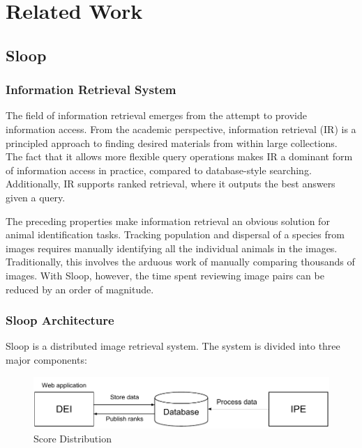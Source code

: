 \graphicspath{{./images/chap2/}}
\chapter{Related Work} %
\label{cha:related_work}

\section{Sloop}

\subsection{Information Retrieval System}

The field of information retrieval emerges from the attempt to provide
information access. From the academic perspective, information retrieval (IR)
is a principled approach to finding desired materials
from within large collections. The fact that it allows more flexible
query operations makes IR a dominant form of information access in practice,
compared to database-style searching. Additionally, IR supports ranked
retrieval, where it outputs the best answers given a query.

The preceding properties make information retrieval an obvious solution for
animal identification tasks. Tracking population and dispersal of a species from
images requires manually identifying all the individual animals in the images.
Traditionally, this involves the arduous work of manually comparing thousands
of images. With Sloop, however, the time spent reviewing image pairs can be
reduced by an order of magnitude.

\subsection{Sloop Architecture} Sloop is a distributed image retrieval system.
The system is divided into three major components:

\begin{figure}[htb]
  \centering
  \includegraphics[width=\textwidth]{sloop/system}
  \caption{Score Distribution}
  \label{fig:sloop_overview} %
\end{figure}

